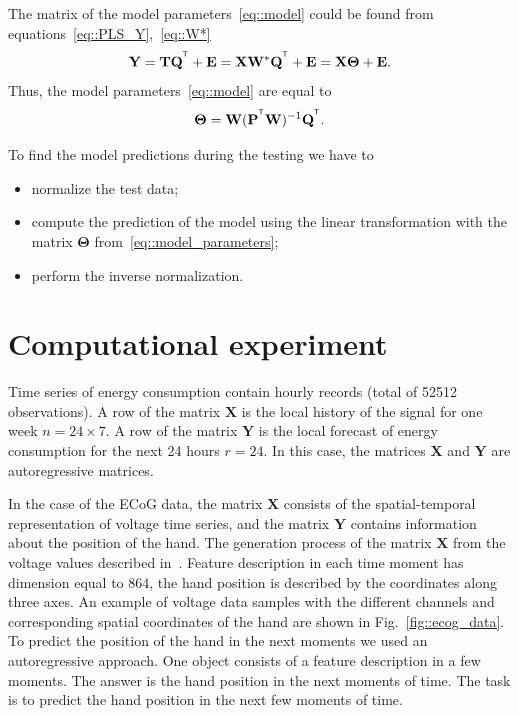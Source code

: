 \documentclass[12pt,twoside]{article}
\newcommand{\bY}{\mathbf{Y}}
\newcommand{\bX}{\mathbf{X}}
\newcommand{\bP}{\mathbf{P}}
\newcommand{\bT}{\mathbf{T}}
\newcommand{\bQ}{\mathbf{Q}}
\newcommand{\bE}{\mathbf{E}}
\newcommand{\bW}{\mathbf{W}}
\newcommand{\bTheta}{\boldsymbol{\Theta}}
\newcommand{\T}{^{\text{\tiny\sffamily\upshape\mdseries T}}}
\begin{document}
The matrix of the model parameters~\ref{eq::model} could be found from equations~\eqref{eq::PLS_Y},~\eqref{eq::W*}
\begin{equation*}
    \bY = \bT \bQ^{\T} + \bE = \bX \bW^* \bQ^{\T} + \bE = \bX \bTheta + \bE.
\end{equation*}
Thus, the model parameters~\eqref{eq::model} are equal to
\begin{equation}
    \bTheta = \bW (\bP^{\T} \bW)^{-1} \bQ^{\T}.
    \label{eq::model_parameters}
\end{equation}

To find the model predictions during the testing we have to
\begin{itemize}
	\item normalize the test data;
	\item compute the prediction of the model using the linear transformation with the matrix $\bTheta$ from~\eqref{eq::model_parameters};
	\item perform the inverse normalization.
\end{itemize}

\section{Computational experiment}

Time series of energy consumption contain hourly records (total of 52512 observations). 
A row of the matrix $\bX$ is the local history of the signal for one week $n = 24 \times 7$. A row of the matrix $\bY$ is the local forecast of energy consumption for the next 24 hours $r = 24$. In this case, the matrices $\bX$ and $\bY$ are autoregressive matrices.

In the case of the ECoG data, the matrix $\bX$ consists of the spatial-temporal representation of voltage time series, and the matrix $\bY$ contains information about the position of the hand.
The generation process of the matrix $\bX$ from the voltage values described in~\cite{gasanov2017pls}. 
Feature description in each time moment has dimension equal to $864$, the hand position is described by the coordinates along three axes. 
An example of voltage data samples with the different channels and corresponding spatial coordinates of the hand are shown in Fig.~\ref{fig::ecog_data}.
To predict the position of the hand in the next moments we used an autoregressive approach.
One object consists of a feature description in a few moments. 
The answer is the hand position in the next moments of time.
The task is to predict the hand position in the next few moments of time.
\end{document}

